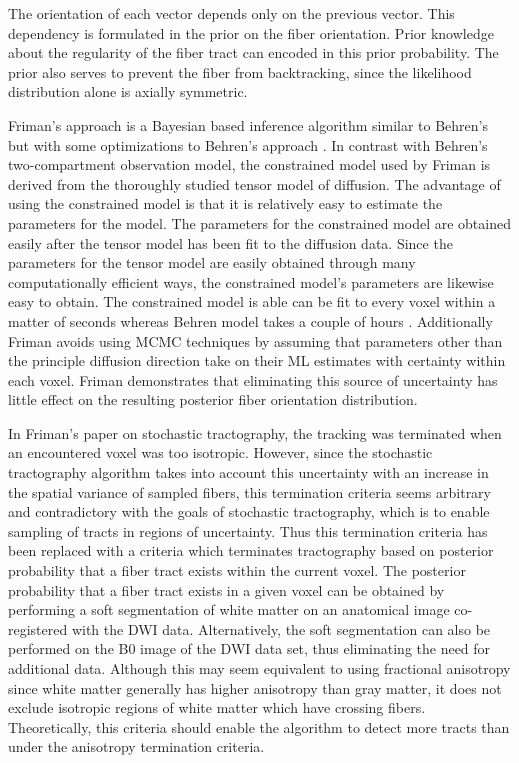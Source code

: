 The orientation of each vector depends only on the previous vector.  This dependency is formulated in the prior on the fiber orientation.  Prior knowledge about the regularity of the fiber tract can encoded in this prior probability.  The prior also serves to prevent the fiber from backtracking, since the likelihood distribution alone is axially symmetric.

Friman's approach is a Bayesian based inference algorithm similar to Behren's but with some optimizations to Behren's approach \cite{frimanTMI06}.  In contrast with Behren's two-compartment observation model, the constrained model used by Friman is derived from the thoroughly studied tensor model of diffusion.  The advantage of using the constrained model is that it is relatively easy to estimate the parameters for the model.  The parameters for the constrained model are obtained easily after the tensor model has been fit to the diffusion data.  Since the parameters for the tensor model are easily obtained through many computationally efficient ways, the constrained model's parameters are likewise easy to obtain.  The constrained model is able can be fit to every voxel within a matter of seconds whereas Behren model takes a couple of hours \cite{frimanTMI06}.  Additionally Friman avoids using MCMC techniques by assuming that parameters other than the principle diffusion direction take on their ML estimates with certainty within each voxel.  Friman demonstrates that eliminating this source of uncertainty has little effect on the resulting posterior fiber orientation distribution.

In Friman's paper on stochastic tractography, the tracking was terminated when an encountered voxel was too isotropic.  However, since the stochastic tractography algorithm takes into account this uncertainty with an increase in the spatial variance of sampled fibers, this termination criteria seems arbitrary and contradictory with the goals of stochastic tractography, which is to enable sampling of tracts in regions of uncertainty.  Thus this termination criteria has been replaced with a criteria which terminates tractography based on posterior probability that a fiber tract exists within the current voxel.  The posterior probability that a fiber tract exists in a given voxel can be obtained by performing a soft segmentation of white matter on an anatomical image co-registered with the DWI data.  Alternatively, the soft segmentation can also be performed on the B0 image of the DWI data set, thus eliminating the need for additional data.  Although this may seem equivalent to using fractional anisotropy since white matter generally has higher anisotropy than gray matter, it does not exclude isotropic regions of white matter which have crossing fibers.  Theoretically, this criteria should enable the algorithm to detect more tracts than under the anisotropy termination criteria.




